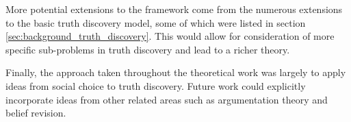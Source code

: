 \documentclass[../main.tex]{subfiles}
\begin{document}
More potential extensions to the framework come from the numerous extensions to
the basic truth discovery model, some of which were listed in section
\ref{sec:background_truth_discovery}. This would allow for consideration of
more specific sub-problems in truth discovery and lead to a richer theory.

Finally, the approach taken throughout the theoretical work was largely to
apply ideas from social choice to truth discovery. Future work could explicitly
incorporate ideas from other related areas such as argumentation theory and
belief revision.

\end{document}
